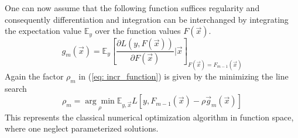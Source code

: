 \documentclass[12pt, a4paper]{article}
\begin{document}
One can now assume that the following function suffices regularity and consequently differentiation and integration can be interchanged by integrating the expectation value $\mathbb{E}_y$ over the function values $F(\vec{x})$. 
\begin{equation}
    g_m(\vec{x}) = \mathbb{E}_y [\frac{\partial L(y, F(\vec{x}))}{\partial F(\vec{x})} | \vec{x}]_{F(\vec{x}) = F_{m-1}(\vec{x})}
\end{equation}
Again the factor $\rho_m$ in (\ref{eq: incr_function}) is given by the minimizing the line search
\begin{equation}
    \rho_m = \underset{\rho}{\arg\min} \mathbb{E}_{y,\vec{x}} L[y,F_{m-1}(\vec{x}) - \rho \vec{g}_m(\vec{x})]
\end{equation}
This represents the classical numerical optimization algorithm in function space, where one neglect parameterized solutions.
\newpage
\end{document}
